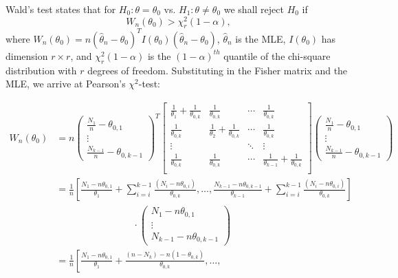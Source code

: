 \documentclass[12pt]{exam}
\begin{document}
		Wald's test states that for $H_0: \theta = \theta_0$ vs. $H_1: \theta \neq \theta_0$ we shall reject $H_0$ if 
		$$W_n(\theta_0) > \chi^2_r(1-\alpha),$$ where $W_n(\theta_0) = n(\hat{\theta}_n - \theta_0)^TI(\theta_0)(\hat{\theta}_n - \theta_0)$, $\hat{\theta}_n$ is the MLE, $I(\theta_0)$ has dimension $r\times r$, and $\chi^2_r(1-\alpha)$ is the $(1-\alpha)^{th}$ quantile of the chi-square distribution with $r$ degrees of freedom. Substituting in the Fisher matrix and the MLE, we arrive at Pearson's $\chi^2$-test:  
		
		\begin{align*}
		W_n(\theta_0)
		& = n \left(\begin{array}{c} \frac{N_1}{n} - \theta_{0,1} \\ \vdots \\ \frac{N_{k-1}}{n}-\theta_{0,k-1} \end{array} \right)^T 
		\left[\begin{array}{cccc} \frac{1}{\theta_1} + \frac{1}{\theta_{0,k}} & \frac{1}{\theta_{0,k}} & \cdots & \frac{1}{\theta_{0,k}} 
		\\ 
		\frac{1}{\theta_{0,k}} & \frac{1}{\theta_2}+ \frac{1}{\theta_{0,k}} & \cdots & \frac{1}{\theta_{0,k}} \\
		\vdots             &  & \ddots & \vdots \\
		\frac{1}{\theta_{0,k}} & \frac{1}{\theta_{0,k}} & \cdots & \frac{1}{\theta_{k-1}} +\frac{1}{\theta_{0,k}} \\
				\end{array} \right]
		\left(\begin{array}{c} \frac{N_1}{n} - \theta_{0,1} \\ \vdots \\ \frac{N_{k-1}}{n}-\theta_{0,k-1} \end{array} \right)\\
		& = \frac{1}{n} 
		\left[\frac{N_1 - n\theta_{0,1}}{\theta_1} +\sum_{i=i}^{k-1}\frac{\left(N_i - n\theta_{0,i}\right)}{\theta_{0,k}}, \dots , 
		\frac{N_{k-1} - n\theta_{0,k-1}}{\theta_{k-1}} +\sum_{i=i}^{k-1}\frac{\left(N_i - n\theta_{0,i}\right)}{\theta_{0,k}}
		\right] \\
		&\qquad \qquad \qquad \qquad \cdot 
\left(\begin{array}{c} N_1 - n\theta_{0,1} \\ \vdots \\ N_{k-1}-n\theta_{0,k-1} \end{array} \right)\\
		& = \frac{1}{n} 
		\left[\frac{N_1 - n\theta_{0,1}}{\theta_1} +\frac{\left(n-N_k\right) - n\left(1-\theta_{0,k}\right)}{\theta_{0,k}}, \dots , 

\end{align*}
\end{document}
